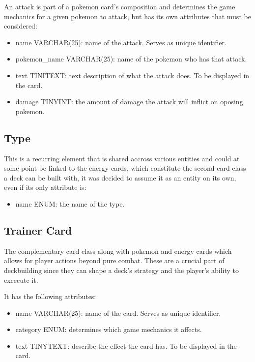 \documentclass{article}
\begin{document}
An attack is part of a pokemon card's composition and determines the game 
mechanics for a given pokemon to attack, but has its own attributes that must 
be considered:

\begin{itemize}
    \item name VARCHAR(25): name of the attack. Serves as unique identifier.
    \item pokemon\_name VARCHAR(25): name of the pokemon who has that attack.
    \item text TINITEXT: text description of what the attack does. To be displayed in 
        the card.
    \item damage TINYINT: the amount of damage the attack will inflict on oposing 
        pokemon.
\end{itemize}

\subsection{Type}

This is a recurring element that is shared accross various entities and could 
at some point be linked to the energy cards, which constitute the second card 
class a deck can be built with, it was decided to assume it as an entity on 
its own, even if its only attribute is:

\begin{itemize}
    \item name ENUM: the name of the type.
\end{itemize}

\subsection{Trainer Card}

The complementary card class along with pokemon and energy cards which allows 
for player actions beyond pure combat. These are a crucial part of 
deckbuilding since they can shape a deck's strategy and the player's ability 
to excecute it.

It has the following attributes:

\begin{itemize}
    \item name VARCHAR(25): name of the card. Serves as unique identifier.
    \item category ENUM: determines which game mechanics it affects.
    \item text TINYTEXT: describe the effect the card has. To be displayed in the card.
\end{itemize}
\end{document}
